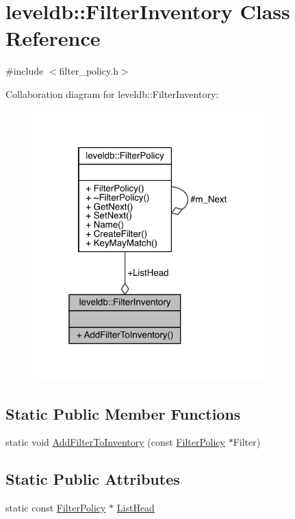 \hypertarget{classleveldb_1_1_filter_inventory}{}\section{leveldb\+:\+:Filter\+Inventory Class Reference}
\label{classleveldb_1_1_filter_inventory}


{\ttfamily \#include $<$filter\+\_\+policy.\+h$>$}



Collaboration diagram for leveldb\+:\+:Filter\+Inventory\+:\nopagebreak
\begin{figure}[H]
\begin{center}
\leavevmode
\includegraphics[width=253pt]{classleveldb_1_1_filter_inventory__coll__graph}
\end{center}
\end{figure}
\subsection*{Static Public Member Functions}
\begin{DoxyCompactItemize}
\item 
static void \hyperlink{classleveldb_1_1_filter_inventory_a9d4a3fa7a519cf96e86317037aaa799c}{Add\+Filter\+To\+Inventory} (const \hyperlink{classleveldb_1_1_filter_policy}{Filter\+Policy} $\ast$Filter)
\end{DoxyCompactItemize}
\subsection*{Static Public Attributes}
\begin{DoxyCompactItemize}
\item 
static const \hyperlink{classleveldb_1_1_filter_policy}{Filter\+Policy} $\ast$ \hyperlink{classleveldb_1_1_filter_inventory_a85bc22a1823f1c19801bda35e83fcfb1}{List\+Head}
\end{DoxyCompactItemize}


